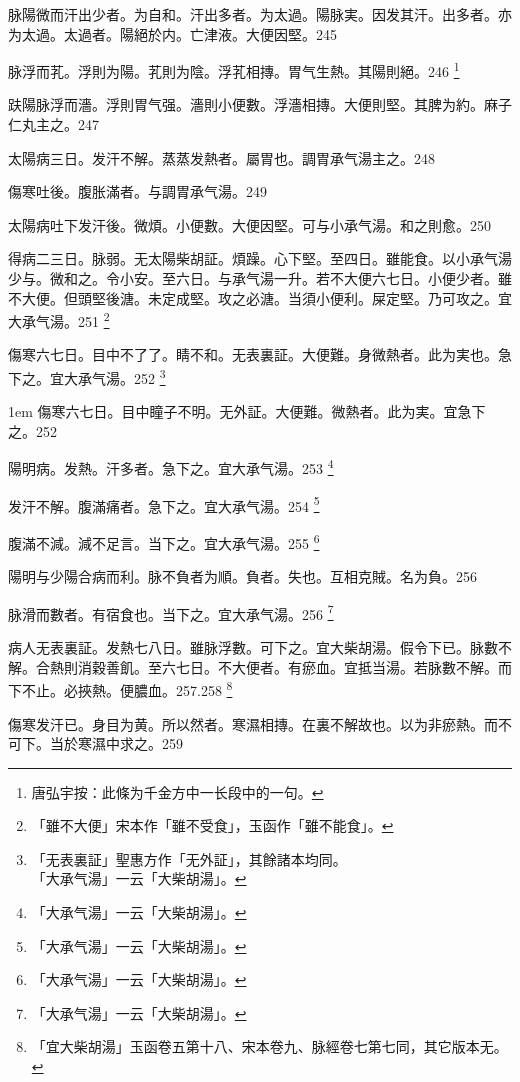脉陽微而汗出少者。为自和。汗出多者。为太過。陽脉実。因发其汗。出多者。亦为太過。太過者。陽絕於内。亡津液。大便因堅。245

脉浮而芤。浮則为陽。芤則为陰。浮芤相摶。胃气生熱。其陽則絕。246
	\footnote{
		唐弘宇按：此條为千金方中一长段中的一句。
	}

趺陽脉浮而濇。浮則胃气强。濇則小便數。浮濇相摶。大便則堅。其脾为約。麻子仁丸主之。247

太陽病三日。发汗不解。蒸蒸发熱者。{\khaaitp 屬胃也。調胃}承气湯主之。248

傷寒吐後。腹{\khaaitp 胀}滿者。与{\khaaitp 調胃}承气湯。249

太陽病吐下发汗後。微煩。小便數。大便因堅。可与小承气湯。和之則愈。250

得病二三日。脉弱。无太陽柴胡証。煩躁。心下堅。至四日。雖能食。以{\khaaitp 小}承气湯少与。微和之。令小安。至六日。与承气湯一升。若不大便六七日。小便少者。雖不大便。但頭堅後溏。未定成堅。攻之必溏。当須小便利。屎定堅。乃可攻之。宜{\khaaitp 大}承气湯。251
	\footnote{「雖不大便」宋本作「雖不受食」，玉函作「雖不能食」。}

傷寒六七日。目中不了了。睛不和。无表{\khaaitp 裏}証。大便難。身微熱者。此为実也。急下之。宜{\khaaitp 大}承气湯。252
	\footnote{
		「无表裏証」聖惠方作「无外証」，其餘諸本均同。\\
		「大承气湯」一云「大柴胡湯」。
	}

\hangindent 1em
傷寒六七日。目中瞳子不明。无外証。大便難。微熱者。此为実。宜急下之。{\gaoben}252

陽明病。发熱。汗多者。急下之。宜{\khaaitp 大}承气湯。253
	\footnote{「大承气湯」一云「大柴胡湯」。}

发汗不解。腹滿痛者。急下之。宜{\khaaitp 大}承气湯。254
	\footnote{「大承气湯」一云「大柴胡湯」。}

腹滿不減。減不足言。当下之。宜{\khaaitp 大}承气湯。255
	\footnote{「大承气湯」一云「大柴胡湯」。}

陽明与少陽合病而利。脉不負者为順。負者。失也。互相克賊。名为負。256

脉滑而數者。有宿食也。当下之。宜{\khaaitp 大}承气湯。256
	\footnote{「大承气湯」一云「大柴胡湯」。}

病人无表裏証。发熱七八日。雖脉浮數。可下之。{\khaaitp 宜大柴胡湯。}假令下已。脉數不解。合熱則消穀善飢。至六七日。不大便者。有瘀血。宜抵当湯。若脉數不解。而下不止。必挾熱。便膿血。257.258
	\footnote{「宜大柴胡湯」玉函卷五第十八、宋本卷九、脉經卷七第七同，其它版本无。}

傷寒发汗已。身目为黄。所以然者。寒濕相摶。在裏不解故也。以为非瘀熱。而不可下。当於寒濕中求之。259

